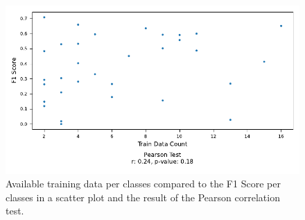 \begin{figure}[H]
\centering
\captionsetup{width=0.8\linewidth}
\includegraphics{figures/f1_per_class_to_data_distribution.pdf}
\caption{Available training data per classes compared to the F1 Score per classes in a scatter plot and the result of the Pearson correlation test.}
\label{fig:f1_per_class_to_data_distribution}
\end{figure}
